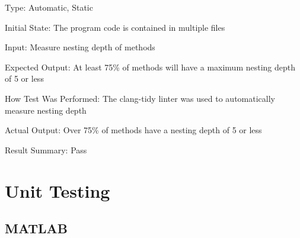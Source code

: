 \documentclass[12pt, titlepage]{article}
\begin{document}
\begin{enumerate}
Type: Automatic, Static

Initial State: The program code is contained in multiple files

Input: Measure nesting depth of methods

Expected Output: At least 75\% of methods will have a maximum nesting depth of 5 or less

How Test Was Performed: The clang-tidy linter was used to automatically measure nesting depth

Actual Output: Over 75\% of methods have a nesting depth of 5 or less

Result Summary: Pass

\end{enumerate}

\section{Unit Testing}

\subsection{MATLAB}
\end{document}
